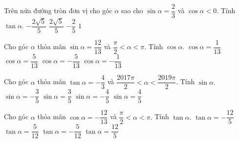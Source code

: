 
\begin{ex}%
	Trên nửa đường tròn đơn vị cho góc $\alpha$  sao cho $\sin\alpha=\dfrac{2}{3} $ và $\cos\alpha<0$. Tính $\tan\alpha$.
	\choice 
		 {\True $-\dfrac{2\sqrt{5}}{5}$}
		 {$\dfrac{2\sqrt{5}}{5}$}
		 {$-\dfrac{2}{5}$}
		{$1$} 
\end{ex}

\begin{ex}%
	 Cho góc $\alpha $ thỏa mãn $\sin \alpha =\dfrac{12}{13}$ và $\dfrac{\pi}{2}<\alpha <\pi $. Tính $\cos \alpha.$
	 \choice
		{$\cos  \alpha =\dfrac{1}{13}$}
		{$\cos \alpha  =\dfrac{5}{13}$}
		 {\True $\cos \alpha =-\dfrac{5}{13}$}
		{$\cos \alpha =-\dfrac{1}{13}$} 
\end{ex}

\begin{ex}%
	Cho góc $\alpha  $ thỏa mãn $\tan \alpha =-\dfrac{4}{3}$ và $\dfrac{2017\pi}{2}<\alpha <\dfrac{2019\pi}{2}$. Tính $\sin \alpha.$
	\choice 
		{$\sin \alpha =-\dfrac{3}{5}$} 
		{$\sin \alpha =\dfrac{3}{5}$} 
		{$\sin \alpha =-\dfrac{4}{5}$} 
		{\True $\sin  \alpha =\dfrac{4}{5}$}
\end{ex}

\begin{ex}%
	Cho góc $\alpha $ thỏa mãn $\cos \alpha  =-\dfrac{12}{13}$ và $\dfrac{\pi}{2}<\alpha <\pi.$ Tính $\tan \alpha.$
	 \choice
		 {$\tan \alpha =-\dfrac{12}{5}$}
		 {$\tan \alpha =\dfrac{5}{12}$}
		{\True $\tan \alpha  =-\dfrac{5}{12}$}
		{$\tan \alpha =\dfrac{12}{5}$} 
\end{ex}

